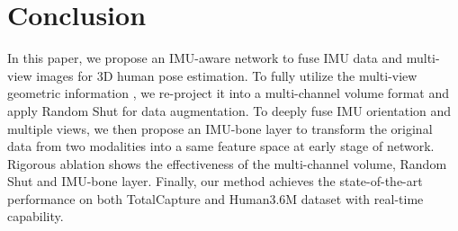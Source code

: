 \documentclass[10pt,twocolumn,letterpaper]{article}
\begin{document}
\section{Conclusion}
\label{sec:conc}
In this paper, we propose an IMU-aware network to fuse IMU data and multi-view images for 3D human pose estimation. To fully utilize the multi-view geometric information , we re-project it into a multi-channel volume format and apply Random Shut for data augmentation. To deeply fuse IMU orientation and multiple views, we then propose an IMU-bone layer to transform the original data from two modalities into a same feature space at early stage of network. Rigorous ablation shows the effectiveness of the multi-channel volume, Random Shut and IMU-bone layer. Finally, our method achieves the state-of-the-art performance on both TotalCapture and Human3.6M dataset with real-time capability. 





{\small


}
\end{document}

